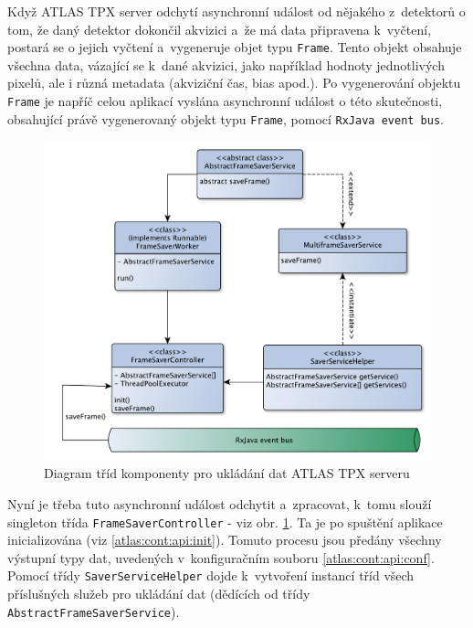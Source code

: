 Když ATLAS TPX server odchytí asynchronní událost od nějakého z~detektorů o tom, že daný detektor dokončil akvizici a~že má data připravena k~vyčtení, postará se o jejich vyčtení a~vygeneruje objet typu \texttt{Frame}. Tento objekt obsahuje všechna data, vázající se k~dané akvizici, jako například hodnoty jednotlivých pixelů, ale i různá metadata (akviziční čas, bias apod.). Po vygenerování objektu \texttt{Frame} je napříč celou aplikací vyslána asynchronní událost o této skutečnosti, obsahující právě vygenerovaný objekt typu \texttt{Frame}, pomocí \texttt{RxJava event bus}.

\begin{figure}[t]
	\begin{center}
		\includegraphics[width=15cm]{figures/atlas_tpx_saver_service.pdf}
		\caption{Diagram tříd komponenty pro ukládání dat ATLAS TPX serveru}
		\label{fig:atlas:saver-service}
	\end{center}
\end{figure}

Nyní je třeba tuto asynchronní událost odchytit a~zpracovat, k~tomu slouží singleton třída \texttt{FrameSaverController} - viz obr. \ref{fig:atlas:saver-service}. Ta je po spuštění aplikace inicializována (viz \ref{atlas:cont:api:init}). Tomuto procesu jsou předány všechny výstupní typy dat, uvedených v~konfiguračním souboru \ref{atlas:cont:api:conf}. Pomocí třídy \texttt{SaverServiceHelper} dojde k~vytvoření instancí tříd všech příslušných služeb pro ukládání dat (dědících od třídy \texttt{AbstractFrameSaverService}).

